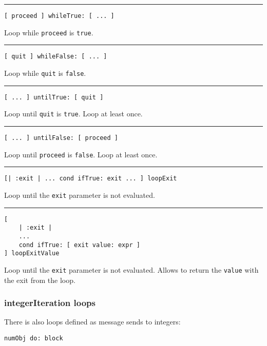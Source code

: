 \documentclass[10pt]{article}
\begin{document}
\begin{multicols*}{3}
\vspace*{0.2cm}
\hrule

\begin{lstlisting}
[ proceed ] whileTrue: [ ... ]
\end{lstlisting}
Loop while \texttt{proceed} is \texttt{true}.

\vspace*{0.2cm}
\hrule

\begin{lstlisting}
[ quit ] whileFalse: [ ... ]
\end{lstlisting}
Loop while \texttt{quit} is \texttt{false}.

\vspace*{0.2cm}
\hrule

\begin{lstlisting}
[ ... ] untilTrue: [ quit ]
\end{lstlisting}
Loop until \texttt{quit} is \texttt{true}. Loop at least once.

\vspace*{0.2cm}
\hrule

\begin{lstlisting}
[ ... ] untilFalse: [ proceed ]
\end{lstlisting}
Loop until \texttt{proceed} is \texttt{false}. Loop at least once.

\vspace*{0.2cm}
\hrule

\begin{lstlisting}
[| :exit | ... cond ifTrue: exit ... ] loopExit
\end{lstlisting}
Loop until the \texttt{exit} parameter is not evaluated.

\vspace*{0.2cm}
\hrule

\begin{lstlisting}
[
    | :exit |
    ...
    cond ifTrue: [ exit value: expr ]
] loopExitValue
\end{lstlisting}
Loop until the \texttt{exit} parameter is not evaluated. Allows to return the \texttt{value} with the exit from the loop.




\subsubsection{integerIteration loops}
There is also loops defined as message sends to integers:

\begin{lstlisting}
numObj do: block
\end{lstlisting}


\end{multicols*}
\end{document}
